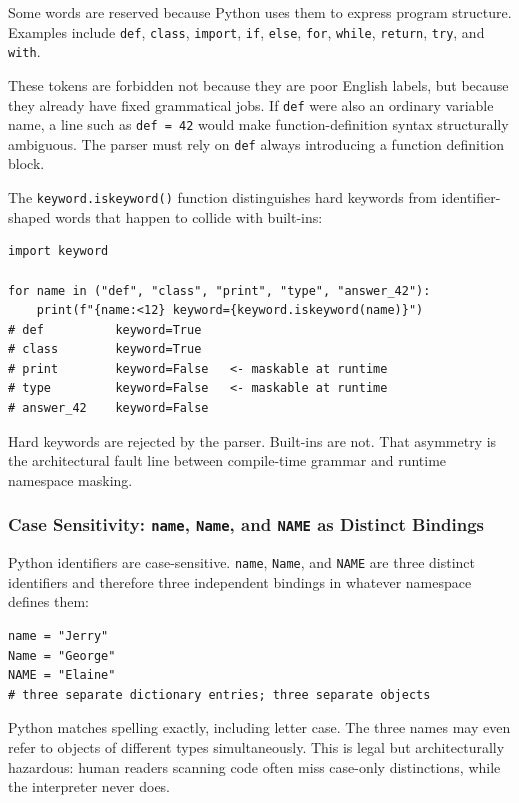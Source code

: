 \documentclass[a4paper,twoside]{report}
\begin{document}
Some words are reserved because Python uses them to express program structure. Examples include \texttt{def}, \texttt{class}, \texttt{import}, \texttt{if}, \texttt{else}, \texttt{for}, \texttt{while}, \texttt{return}, \texttt{try}, and \texttt{with}.

These tokens are forbidden not because they are poor English labels, but because they already have fixed grammatical jobs. If \texttt{def} were also an ordinary variable name, a line such as \texttt{def = 42} would make function-definition syntax structurally ambiguous. The parser must rely on \texttt{def} always introducing a function definition block.

The \texttt{keyword.iskeyword()} function distinguishes hard keywords from identifier-shaped words that happen to collide with built-ins:

\begin{verbatim}
import keyword

for name in ("def", "class", "print", "type", "answer_42"):
    print(f"{name:<12} keyword={keyword.iskeyword(name)}")
# def          keyword=True
# class        keyword=True
# print        keyword=False   <- maskable at runtime
# type         keyword=False   <- maskable at runtime
# answer_42    keyword=False
\end{verbatim}

Hard keywords are rejected by the parser. Built-ins are not. That asymmetry is the architectural fault line between compile-time grammar and runtime namespace masking.

\subsubsection{Case Sensitivity: \texttt{name}, \texttt{Name}, and \texttt{NAME} as Distinct Bindings}

Python identifiers are case-sensitive. \texttt{name}, \texttt{Name}, and \texttt{NAME} are three distinct identifiers and therefore three independent bindings in whatever namespace defines them:

\begin{verbatim}
name = "Jerry"
Name = "George"
NAME = "Elaine"
# three separate dictionary entries; three separate objects
\end{verbatim}

Python matches spelling exactly, including letter case. The three names may even refer to objects of different types simultaneously. This is legal but architecturally hazardous: human readers scanning code often miss case-only distinctions, while the interpreter never does.
\end{document}
